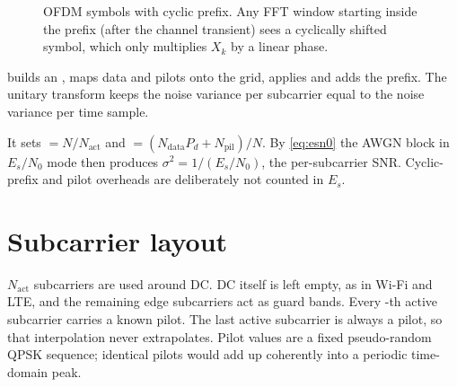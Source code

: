 \begin{figure}[htbp]
\centering
{}
\caption{OFDM symbols with cyclic prefix. Any FFT window starting inside the prefix (after the
channel transient) sees a cyclically shifted symbol, which only multiplies $X_k$ by a linear phase.}
\label{fig:ofdm-cp}
\end{figure}

\begin{incode}
 builds an , maps data and pilots onto the grid, applies
 and adds the prefix. The unitary transform keeps the
noise variance per subcarrier equal to the noise variance per time sample.

It sets $=N/N_{\mathrm{act}}$ and
$=(N_{\mathrm{data}}P_d+N_{\mathrm{pil}})/N$. By \cref{eq:esn0} the AWGN block in
$E_s/N_0$ mode then produces $\sigma^2=1/(E_s/N_0)$, the per-subcarrier SNR. Cyclic-prefix and
pilot overheads are deliberately not counted in $E_s$.
\end{incode}

\section{Subcarrier layout}
$N_{\mathrm{act}}$ subcarriers are used around DC. DC itself is left empty, as in Wi-Fi and LTE,
and the remaining edge subcarriers act as guard bands. Every -th active
subcarrier carries a known pilot. The last active subcarrier is always a pilot, so that
interpolation never extrapolates. Pilot values are a fixed pseudo-random QPSK sequence;
identical pilots would add up coherently into a periodic time-domain peak.

